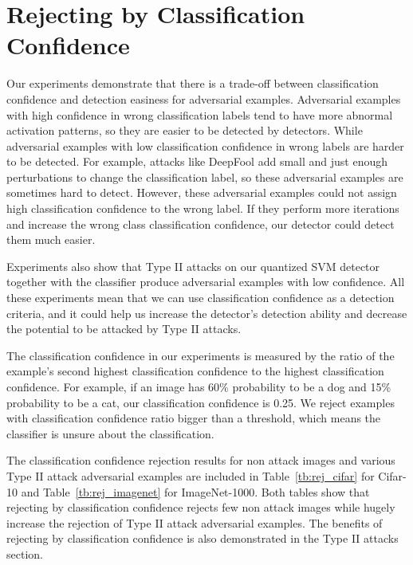 \documentclass[10pt,twocolumn,letterpaper]{article}
\begin{document}
\section{Rejecting by Classification Confidence}
Our experiments demonstrate that there is a trade-off between classification confidence and detection easiness for adversarial examples. 
Adversarial examples with high confidence in wrong classification labels tend to have more abnormal activation patterns, so they are easier to be
detected by detectors. While adversarial examples with low classification confidence in wrong labels are harder to be detected. For example,
attacks like DeepFool add small and just enough perturbations to change the classification label, so these adversarial examples are sometimes hard to detect. 
However, these adversarial examples could not assign high classification confidence to the wrong label. If they perform more iterations and increase
the wrong class classification confidence, our detector could detect them much easier. 

Experiments also show that Type II attacks on our quantized SVM detector together with the classifier produce adversarial examples with low confidence. All these experiments
mean that we can use classification confidence as a detection criteria, and it could help us increase the detector's detection ability and decrease the potential
to be attacked by Type II attacks. 

The classification confidence in our experiments is measured by the ratio of the example's second highest classification confidence to the highest classification confidence. 
For example, if an image has 60\% probability to be a dog and 15\% probability to be a cat, our classification confidence is 0.25. 
We reject examples with classification confidence ratio bigger than a threshold, which means the classifier is unsure about the classification. 

The classification confidence rejection results for non attack images and various Type II attack adversarial examples are included in 
Table~\ref{tb:rej_cifar} for Cifar-10 and Table~\ref{tb:rej_imagenet} for ImageNet-1000. Both tables show that rejecting by classification confidence rejects few non 
attack images while hugely increase the rejection of Type II attack adversarial examples. The benefits of rejecting by classification confidence is also demonstrated in
the Type II attacks section. 
\end{document}

